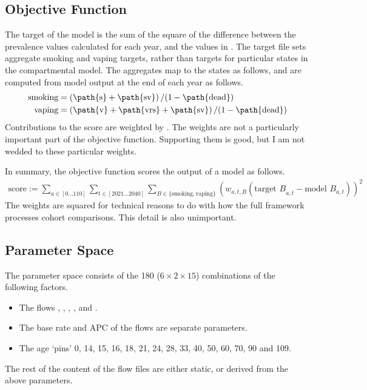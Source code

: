 \documentclass[]{article}
\begin{document}
	\subsection{Objective Function}
	The target of the model is the sum of the square of the difference between the prevalence values calculated for each year, and the values in . The target file sets aggregate smoking and vaping targets, rather than targets for particular states in the compartmental model. The aggregates map to the states as follows, and are computed from model output at the end of each year as follows.
	\begin{align*}
		\text{smoking} &= \left(\text{\path{s}} + \text{\path{sv}}\right) / (1 - \text{\path{dead}}) \\
		\text{vaping} &= \left(\text{\path{v}} + \text{\path{vrs}} + \text{\path{sv}}\right) / (1 - \text{\path{dead}})
	\end{align*}
	Contributions to the score are weighted by . The weights are not a particularly important part of the objective function. Supporting them is good, but I am not wedded to these particular weights.
	
	In summary, the objective function scores the output of a model as follows.
	\begin{align*}
		\text{score} := \sum_{a \in [0\ldots110]} \sum_{t \in [2021\ldots2040]} \sum_{B \in \{\text{smoking}, \text{vaping}\}}\left(w_{a, t, B} \left(\text{target $B$}_{a, t} - \text{model $B$}_{a, t}\right)\right)^2
	\end{align*}
	The weights are squared for technical reasons to do with how the full framework processes cohort comparisons. This detail is also unimportant.
	
	\subsection{Parameter Space}
	The parameter space consists of the 180 ($6 \times 2 \times 15$) combinations of the following factors.
	\begin{itemize}
		\item The flows , , , ,  and .
		\item The base rate and APC of the flows are separate parameters.
		\item The age `pins' 0, 14, 15, 16, 18, 21, 24, 28, 33, 40, 50, 60, 70, 90 and 109.
	\end{itemize}
	The rest of the content of the flow files are either static, or derived from the above parameters.
	
\end{document}
